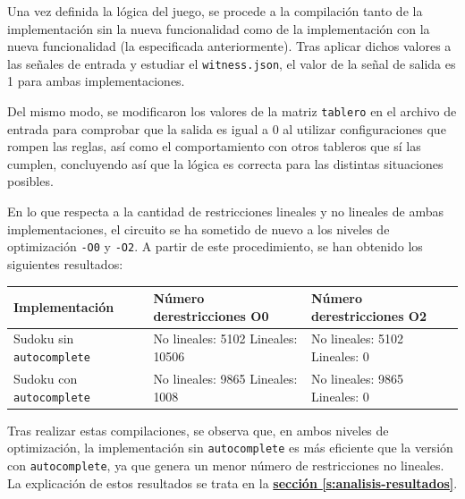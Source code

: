 \documentclass[a4paper,12pt]{report}
\begin{document}
	\vspace{0.2cm}
	\noindent Una vez definida la lógica del juego, se procede a la compilación tanto de la implementación sin la nueva funcionalidad como de la implementación con la nueva funcionalidad (la especificada anteriormente). Tras aplicar dichos valores a las señales de entrada y estudiar el \texttt{witness.json}, el valor de la señal de salida es 1 para ambas implementaciones.
	
	\vspace{0.2cm}
	\noindent Del mismo modo, se modificaron los valores de la matriz \texttt{tablero} en el archivo de entrada para comprobar que la salida es igual a 0 al utilizar configuraciones que rompen las reglas, así como el comportamiento con otros tableros que sí las cumplen, concluyendo así que la lógica es correcta para las distintas situaciones posibles.
	
	\vspace{0.2cm}
	\noindent En lo que respecta a la cantidad de restricciones lineales y no lineales de ambas implementaciones, el circuito se ha sometido de nuevo a los niveles de optimización \texttt{-O0} y \texttt{-O2}. A partir de este procedimiento, se han obtenido los siguientes resultados:
	
	\vspace{0.2cm}
	\begingroup 
	\renewcommand{\arraystretch}{1.8} 
	\begin{longtable}{|>{\centering\arraybackslash}m{4.5cm}|>{\centering\arraybackslash}m{4.8cm}|>{\centering\arraybackslash}m{4.8cm}|}
		\hline
		\textbf{Implementación} & \textbf{Número de\newline restricciones O0} & \textbf{Número de\newline restricciones O2} \\
		\hline
		
		Sudoku sin \texttt{autocomplete} & No lineales: 5102 \newline Lineales: 10506 & No lineales: 5102 \newline Lineales: 0 \\
		\hline
		
		Sudoku con \texttt{autocomplete} & No lineales: 9865 \newline Lineales: 1008 & No lineales: 9865 \newline Lineales: 0 \\
		\hline
	\end{longtable}
	\endgroup
	
	\vspace{0.2cm}
	\noindent Tras realizar estas compilaciones, se observa que, en ambos niveles de optimización, la implementación sin \texttt{autocomplete} es más eficiente que la versión con \texttt{autocomplete}, ya que genera un menor número de restricciones no lineales. La explicación de estos resultados se trata en la \hyperref[s:analisis-resultados]{\textbf{sección \ref{s:analisis-resultados}}}.
	
\end{document}
